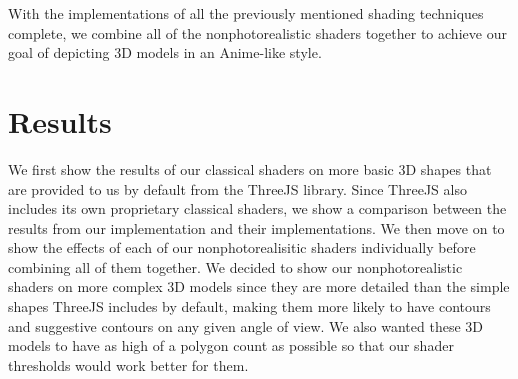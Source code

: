 \documentclass[10pt,twocolumn,letterpaper]{article}
\begin{document}
With the implementations of all the previously mentioned shading techniques complete, we combine all of the nonphotorealistic shaders together to achieve our goal of depicting 3D models in an Anime-like style.

\section{Results}
\label{sec:results}

We first show the results of our classical shaders on more basic 3D shapes that are provided to us by default from the ThreeJS library. Since ThreeJS also includes its own proprietary classical shaders, we show a comparison between the results from our implementation and their implementations. We then move on to show the effects of each of our nonphotorealisitic shaders individually before combining all of them together. We decided to show our nonphotorealistic shaders on more complex 3D models since they are more detailed than the simple shapes ThreeJS includes by default, making them more likely to have contours and suggestive contours on any given angle of view. We also wanted these 3D models to have as high of a polygon count as possible so that our shader thresholds would work better for them.
\end{document}
